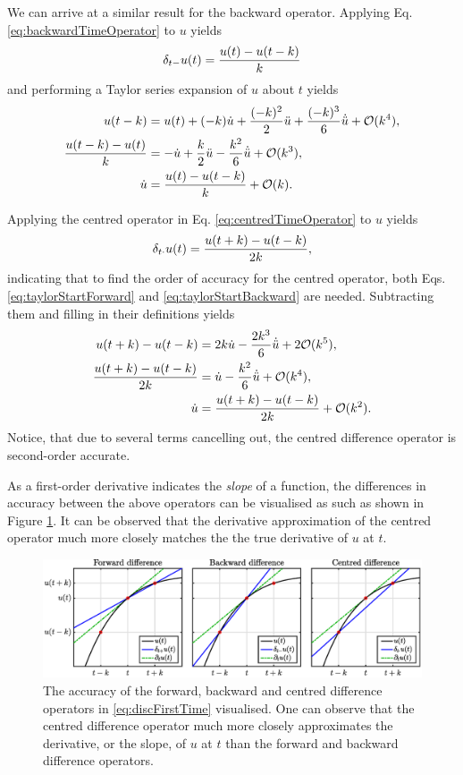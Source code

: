 We can arrive at a similar result for the backward operator. Applying Eq. \eqref{eq:backwardTimeOperator} to $u$ yields
\begin{equation}
    \delta_{t-} u(t) = \frac{u(t) - u(t-k)}{k}
\end{equation}
and performing a Taylor series expansion of $u$ about $t$ yields
\begin{align}
    u(t-k) &= u(t) + (-k) \dot u + \frac{(-k)^2}{2} \ddot u +\frac{(-k)^3}{6}\dot{\ddot{u}} + \mathcal{O}(k^4),\label{eq:taylorStartBackward}\\
    \frac{u(t-k) - u(t)}{k} &= -\dot u + \frac{k}{2} \ddot u - \frac{k^2}{6}\dot{\ddot{u}} + \mathcal{O}(k^3),\nonumber\\
    \dot u &= \frac{u(t) - u(t-k)}{k} + \mathcal{O}(k).
\end{align}

Applying the centred operator in Eq. \eqref{eq:centredTimeOperator} to $u$ yields
\begin{equation}
    \delta_{t\cdot} u(t) = \frac{u(t+k) - u(t-k)}{2k},
\end{equation}
indicating that to find the order of accuracy for the centred operator, both Eqs. \eqref{eq:taylorStartForward} and \eqref{eq:taylorStartBackward} are needed. Subtracting them and filling in their definitions yields
\begin{align}
    u(t+k) - u(t-k) &= 2k\dot u - \frac{2k^3}{6}\dot{\ddot{u}} + 2\mathcal{O}(k^5),\\
    \frac{u(t+k) - u(t-k)}{2k} &= \dot u - \frac{k^2}{6}\dot{\ddot{u}} + \mathcal{O}(k^4),\\
    \dot u &= \frac{u(t+k) - u(t-k)}{2k} + \mathcal{O}(k^2).
\end{align}
Notice, that due to several terms cancelling out, the centred difference operator is second-order accurate. 

As a first-order derivative indicates the \textit{slope} of a function, the differences in accuracy between the above operators can be visualised as such as shown in Figure \ref{fig:taylor}. It can be observed that the derivative approximation of the centred operator much more closely matches the the true derivative of $u$ at $t$.

\begin{figure}[h]
    \includegraphics[width=\textwidth]{figures/fdtd/taylor.eps}
    \caption{\label{fig:taylor} The accuracy of the forward, backward and centred difference operators in \eqref{eq:discFirstTime} visualised. One can observe that the centred difference operator much more closely approximates the derivative, or the slope, of $u$ at $t$ than the forward and backward difference operators.}
\end{figure}

